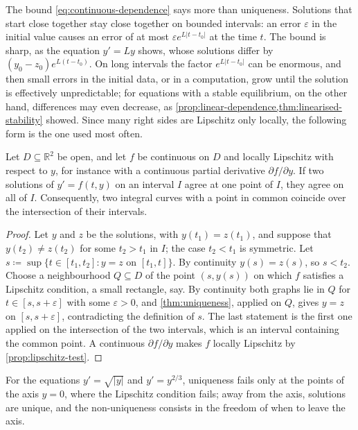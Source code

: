 The bound \eqref{eq:continuous-dependence} says more than uniqueness. Solutions that start close together stay close together on bounded intervals: an error $\varepsilon$ in the initial value causes an error of at most $\varepsilon e^{L|t-t_0|}$ at the time $t$. The bound is sharp, as the equation $y'=Ly$ shows, whose solutions differ by $(y_0-z_0)e^{L(t-t_0)}$. On long intervals the factor $e^{L|t-t_0|}$ can be enormous, and then small errors in the initial data, or in a computation, grow until the solution is effectively unpredictable; for equations with a stable equilibrium, on the other hand, differences may even decrease, as \cref{prop:linear-dependence,thm:linearised-stability} showed. Since many right sides are Lipschitz only locally, the following form is the one used most often.

\begin{corollary}
\label{cor:local-uniqueness}
Let $D\subseteq\mathbb R^2$ be open, and let $f$ be continuous on $D$ and locally Lipschitz with respect to $y$, for instance with a continuous partial derivative $\partial f/\partial y$. If two solutions of $y'=f(t,y)$ on an interval $I$ agree at one point of $I$, they agree on all of $I$. Consequently, two integral curves with a point in common coincide over the intersection of their intervals.
\end{corollary}

\begin{proof}
Let $y$ and $z$ be the solutions, with $y(t_1)=z(t_1)$, and suppose that $y(t_2)\ne z(t_2)$ for some $t_2>t_1$ in $I$; the case $t_2<t_1$ is symmetric. Let $s\coloneqq\sup\{t\in[t_1,t_2]:y=z\text{ on }[t_1,t]\}$. By continuity $y(s)=z(s)$, so $s<t_2$. Choose a neighbourhood $Q\subseteq D$ of the point $(s,y(s))$ on which $f$ satisfies a Lipschitz condition, a small rectangle, say. By continuity both graphs lie in $Q$ for $t\in[s,s+\varepsilon]$ with some $\varepsilon>0$, and \cref{thm:uniqueness}, applied on $Q$, gives $y=z$ on $[s,s+\varepsilon]$, contradicting the definition of $s$. The last statement is the first one applied on the intersection of the two intervals, which is an interval containing the common point. A continuous $\partial f/\partial y$ makes $f$ locally Lipschitz by \cref{prop:lipschitz-test}.
\end{proof}

For the equations $y'=\sqrt{|y|}$ and $y'=y^{2/3}$, uniqueness fails only at the points of the axis $y=0$, where the Lipschitz condition fails; away from the axis, solutions are unique, and the non-uniqueness consists in the freedom of when to leave the axis.

